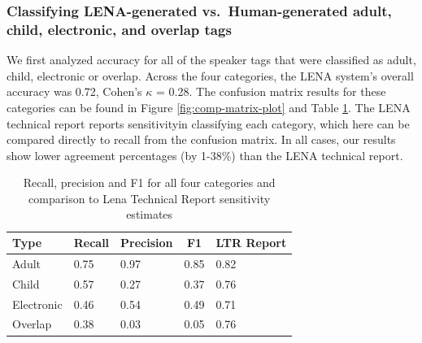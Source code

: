 \documentclass[man,floatsintext]{apa6}
\theoremstyle{definition}
\theoremstyle{definition}
\theoremstyle{definition}
\theoremstyle{remark}
\begin{document}
\hypertarget{classifying-lena-generated-vs.-human-generated-adult-child-electronic-and-overlap-tags}{%
\subsubsection{Classifying LENA-generated vs.~Human-generated adult,
child, electronic, and overlap
tags}\label{classifying-lena-generated-vs.-human-generated-adult-child-electronic-and-overlap-tags}}

We first analyzed accuracy for all of the speaker tags that were
classified as adult, child, electronic or overlap. Across the four
categories, the LENA system's overall accuracy was 0.72, Cohen's
\(\kappa\) = 0.28. The confusion matrix results for these categories can
be found in Figure \ref{fig:comp-matrix-plot} and Table
\ref{tab:comprehensive-matrix-tables}. The LENA technical report
\citep{Xu2009} reports sensitivityin classifying each category, which
here can be compared directly to recall from the confusion matrix. In
all cases, our results show lower agreement percentages (by 1-38\%) than
the LENA technical report.

\begin{table}[H]
\begin{center}
\begin{threeparttable}
\caption{\label{tab:comprehensive-matrix-tables}Recall, precision and F1 for all four categories and comparison to Lena Technical Report sensitivity estimates}
\begin{tabular}{lllll}
\toprule
Type & \multicolumn{1}{c}{Recall} & \multicolumn{1}{c}{Precision} & \multicolumn{1}{c}{F1} & \multicolumn{1}{c}{LTR Report}\\
\midrule
Adult & 0.75 & 0.97 & 0.85 & 0.82\\
Child & 0.57 & 0.27 & 0.37 & 0.76\\
Electronic & 0.46 & 0.54 & 0.49 & 0.71\\
Overlap & 0.38 & 0.03 & 0.05 & 0.76\\
\bottomrule
\end{tabular}
\end{threeparttable}
\end{center}
\end{table}
\end{document}
